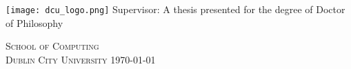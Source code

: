 \begin{titlepage}
    \begin{center}
        \vspace*{1cm}
        \Huge
        \textbf{\thesisTitle}
\vfill
        \LARGE
        \thesisSubTitle
\vfill       
        \LARGE
        \textbf{\authorName}
\vfill     
        \authorQual
\vfill
        \texttt{[image: dcu\_logo.png]}
\vfill
        Supervisor: \supervisorName
\vfill      
        \Large
        A thesis presented for the degree of Doctor of Philosophy
        
\vfill
        \LARGE
	    \textsc{School of Computing \\
	    Dublin City University}
\vfill	    
	    \LARGE
	    \monthyeardate\today

    \end{center}
\end{titlepage}